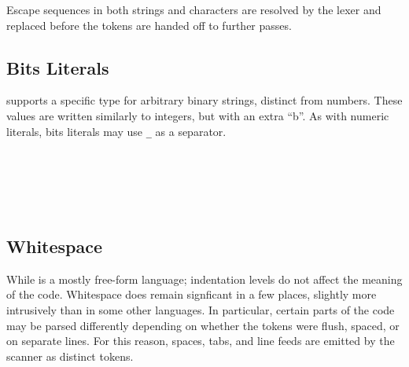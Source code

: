Escape sequences in both strings and characters are resolved by the lexer
and replaced before the tokens are handed off to further passes.

\FloatBarrier
\subsection{Bits Literals}

\Trilogy{} supports a specific type for arbitrary binary strings, distinct
from numbers. These values are written similarly to integers, but with an
extra ``b''. As with numeric literals, bits literals may use \texttt{\_}
as a separator.

\begin{bnf*}
     \\
     \\
     \\
     \\
\end{bnf*}

\subsection{Whitespace}

While \Trilogy{} is a mostly free-form language; indentation levels do not affect
the meaning of the code. Whitespace does remain signficant in a few places, slightly
more intrusively than in some other languages. In particular, certain parts of the
code may be parsed differently depending on whether the tokens were flush, spaced, or
on separate lines. For this reason, spaces, tabs, and line feeds are emitted by the
scanner as distinct tokens.

\begin{bnf*}
     \\
     \\
\end{bnf*}


